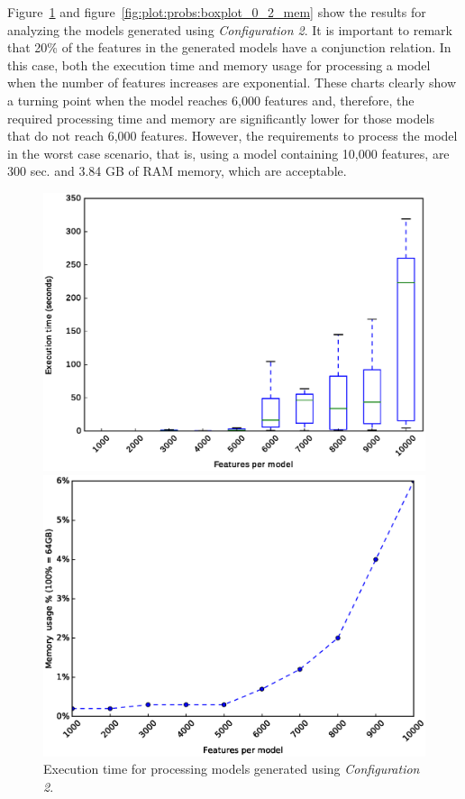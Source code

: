 Figure~\ref{fig:plot:probs:boxplot_0_2} and figure~\ref{fig:plot:probs:boxplot_0_2_mem} show the results for analyzing the models generated using \textit{Configuration 2}. It is important to remark that 20\% of the features in the generated models have a conjunction relation. In this case, both the execution time and memory usage for processing a model when the number of features increases are exponential. These charts clearly show a turning point when the model reaches 6,000 features and, therefore, the required processing time and  memory are significantly lower for those models that do not reach 6,000 features. However, the requirements to process the model in the worst case scenario, that is, using a model containing 10,000 features, are 300 sec. and 3.84 GB of RAM memory, which are acceptable.

\begin{figure}[h]
	\centering
	\begin{minipage}[b]{0.48\textwidth}
		\includegraphics[width=\textwidth]{boxplot_0_2.eps}
		\caption{Execution time for processing models generated using \textit{Configuration 2}.}\label{fig:plot:probs:boxplot_0_2}
	\end{minipage}
	\hfill
	\begin{minipage}[b]{0.48\textwidth}
		\includegraphics[width=\textwidth]{boxplot_mem.eps}

\end{minipage}
\end{figure}
